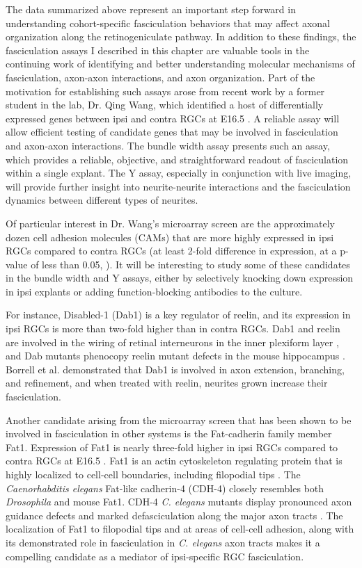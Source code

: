 \label{sec:InVitroFuture}
The data summarized above represent an important step forward in understanding cohort-specific fasciculation behaviors that may affect axonal organization along the retinogeniculate pathway.
In addition to these findings, the fasciculation assays I described in this chapter are valuable tools in the continuing work of identifying and better understanding molecular mechanisms of fasciculation, axon-axon interactions, and axon organization.
Part of the motivation for establishing such assays arose from recent work by a former student in the lab, Dr. Qing Wang, which identified a host of differentially expressed genes between ipsi and contra RGCs at E16.5 \cite{wang2016ipsilateral}.
A reliable \invitro{} assay will allow efficient testing of candidate genes that may be involved in fasciculation and axon-axon interactions.
The bundle width assay presents such an assay, which provides a reliable, objective, and straightforward readout of fasciculation within a single explant.
The Y assay, especially in conjunction with live imaging, will provide further insight into neurite-neurite interactions and the fasciculation dynamics between different types of neurites.

Of particular interest in Dr. Wang's microarray screen are the approximately dozen cell adhesion molecules (CAMs) that are more highly expressed in ipsi RGCs compared to contra RGCs (at least 2-fold difference in expression, at a p-value of less than 0.05, ).
It will be interesting to study some of these candidates in the bundle width and Y assays, either by selectively knocking down expression in ipsi explants or adding function-blocking antibodies to the culture.

For instance, Disabled-1 (Dab1) is a key regulator of reelin, and its expression in ipsi RGCs is more than two-fold higher than in contra RGCs.
Dab1 and reelin are involved in the wiring of retinal interneurons in the inner plexiform layer \cite{rice2001reelin}, and Dab mutants phenocopy reelin mutant defects in the mouse hippocampus \cite{borrell2007reelin}.
Borrell et al.  demonstrated that Dab1 is involved in axon extension, branching, and refinement, and when treated with reelin, neurites grown \invitro{} increase their fasciculation.

Another candidate arising from the microarray screen that has been shown to be involved in fasciculation in other systems is the Fat-cadherin family member Fat1.
Expression of Fat1 is nearly three-fold higher in ipsi RGCs compared to contra RGCs at E16.5 \cite{wang2016ipsilateral}.
Fat1 is an actin cytoskeleton regulating protein that is highly localized to cell-cell boundaries, including filopodial tips \cite{tanoue2004mammalian}.
The \emph{Caenorhabditis elegans} Fat-like cadherin-4 (CDH-4) closely resembles both \emph{Drosophila} and mouse Fat1.
CDH-4 \emph{C. elegans} mutants display pronounced axon guidance defects and marked defasciculation along the major axon tracts \cite{schmitz2008fat}.
The localization of Fat1 to filopodial tips and at areas of cell-cell adhesion, along with its demonstrated role in fasciculation in \emph{C. elegans} axon tracts makes it a compelling candidate as a mediator of ipsi-specific RGC fasciculation.

